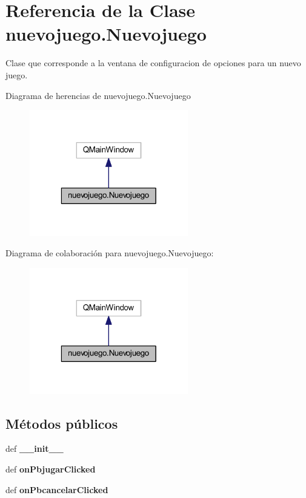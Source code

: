 \section{Referencia de la Clase nuevojuego.\-Nuevojuego}
\label{classnuevojuego_1_1_nuevojuego}


Clase que corresponde a la ventana de configuracion de opciones para un nuevo juego.  




Diagrama de herencias de nuevojuego.\-Nuevojuego\nopagebreak
\begin{figure}[H]
\begin{center}
\leavevmode
\includegraphics[width=196pt]{classnuevojuego_1_1_nuevojuego__inherit__graph}
\end{center}
\end{figure}


Diagrama de colaboración para nuevojuego.\-Nuevojuego\-:\nopagebreak
\begin{figure}[H]
\begin{center}
\leavevmode
\includegraphics[width=196pt]{classnuevojuego_1_1_nuevojuego__coll__graph}
\end{center}
\end{figure}
\subsection*{Métodos públicos}
\begin{DoxyCompactItemize}
\item 
def {\bf \-\_\-\-\_\-init\-\_\-\-\_\-}
\item 
def {\bf on\-Pbjugar\-Clicked}
\item 
def {\bf on\-Pbcancelar\-Clicked}
\end{DoxyCompactItemize}
